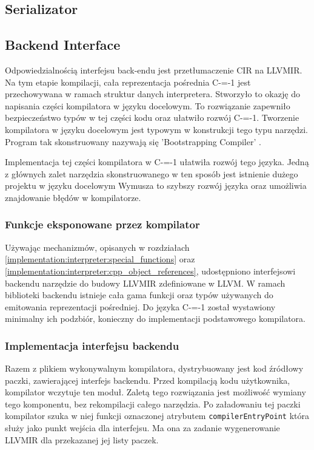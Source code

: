 \subsection{Serializator}
\label{serializer}

\subsection{Backend Interface}
\label{Backend_Interface}
Odpowiedzialnością interfejsu back-endu jest przetłumaczenie CIR na LLVMIR.
Na tym etapie kompilacji, cała reprezentacja pośrednia C-=-1 jest przechowywana w ramach struktur danych interpretera.
Stworzyło to okazję do napisania części kompilatora w języku docelowym.
To rozwiązanie zapewniło bezpieczeństwo typów w tej części kodu oraz ułatwiło rozwój C-=-1.
Tworzenie kompilatora w języku docelowym jest typowym w konstrukcji tego typu narzędzi.
Program tak skonstruowany nazywają się 'Bootstrapping Compiler' \cite{puntambekar:compiler_design}. 

Implementacja tej części kompilatora w C-=-1 ułatwiła rozwój tego języka.
Jedną z głównych zalet narzędzia skonstruowanego w ten sposób jest istnienie dużego projektu w języku docelowym
Wymusza to szybszy rozwój języka oraz umożliwia znajdowanie błędów w kompilatorze.

\subsubsection{Funkcje eksponowane przez kompilator}

Używając mechanizmów, opisanych w rozdziałach \ref{implementation:interpreter:special_functions} oraz \ref{implementation:interpreter:cpp_object_references}, udostępniono interfejsowi backendu narzędzie do budowy LLVMIR zdefiniowane w LLVM.
W ramach biblioteki backendu istnieje cała gama funkcji oraz typów używanych do emitowania reprezentacji pośredniej.
Do języka C-=-1 został wystawiony minimalny ich podzbiór, konieczny do implementacji podstawowego kompilatora.

\subsubsection{Implementacja interfejsu backendu}
Razem z plikiem wykonywalnym kompilatora, dystrybuowany jest kod źródłowy paczki, zawierającej interfejs backendu. 
Przed kompilacją kodu użytkownika, kompilator wczytuje ten moduł.
Zaletą tego rozwiązania jest możliwość wymiany tego komponentu, bez rekompilacji całego narzędzia.
Po załadowaniu tej paczki kompilator szuka w niej funkcji oznaczonej atrybutem \lstinline{compilerEntryPoint} która służy jako punkt wejścia dla interfejsu. 
Ma ona za zadanie wygenerowanie LLVMIR dla przekazanej jej listy paczek.

